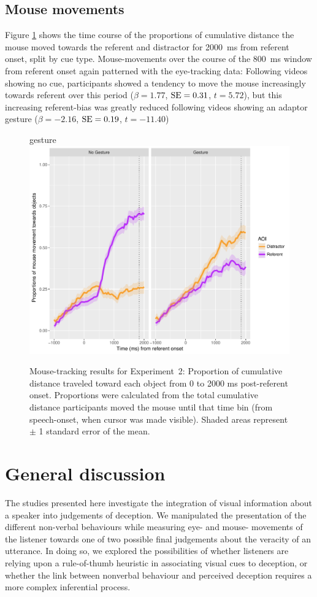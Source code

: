 \documentclass[a4paper,man,natbib]{apa6}
\newcommand{\resultsLM}[3]{$\beta = #1$, $\textnormal{SE} = #2$, $t #3$}
\begin{document}
\subsection{Mouse movements}
Figure \ref{fig:v2_mouse} shows the time course of the proportions of cumulative distance the mouse moved towards the referent and distractor for 2000~ms from referent onset, split by cue type.
Mouse-movements over the course of the 800~ms window from referent onset again patterned with the eye-tracking data:
Following videos showing no cue, participants showed a tendency to move the mouse increasingly towards referent over this period (\resultsLM{1.77}{0.31}{=5.72}), but this increasing referent-bias was greatly reduced following videos showing an adaptor gesture (\resultsLM{-2.16}{0.19}{=-11.40})

\begin{figure}[Ht]gesture
  \centering
	\includegraphics[width=\linewidth]{./img/e8_mouset.pdf}
  \caption{Mouse-tracking results for Experiment~2: Proportion of cumulative distance traveled toward each object from 0 to 2000 ms post-referent onset. Proportions were calculated from the total cumulative distance participants moved the mouse until that time bin (from speech-onset, when cursor was made visible). Shaded areas represent $\pm$ 1 standard error of the mean.}
  \label{fig:v2_mouse}
\end{figure}


\section{General discussion}
The studies presented here investigate the integration of visual information about a speaker into judgements of deception.
We manipulated the presentation of the different non-verbal behaviours while measuring eye- and mouse- movements of the listener towards one of two possible final judgements about the veracity of an utterance.
In doing so, we explored the possibilities of whether listeners are relying upon a rule-of-thumb heuristic in associating visual cues to deception, or whether the link between nonverbal behaviour and perceived deception requires a more complex inferential process.
\end{document}
